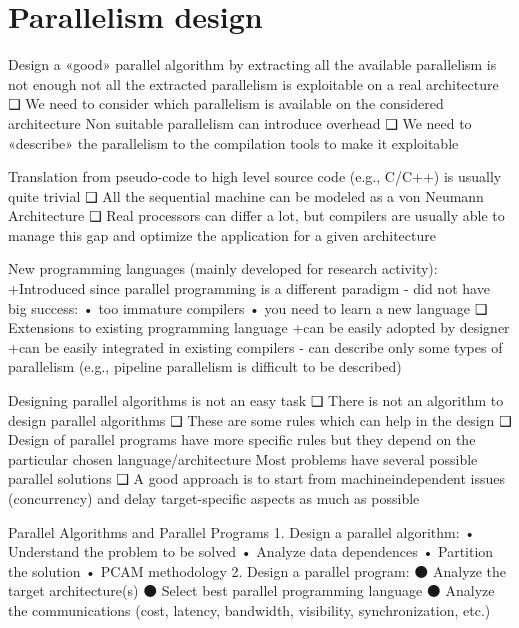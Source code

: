 \section{Parallelism design}




Design a «good» parallel algorithm by extracting
all the available parallelism is not enough
not all the extracted parallelism is exploitable
on a real architecture
❑ We need to consider which parallelism is available
on the considered architecture
Non suitable parallelism can introduce overhead
❑ We need to «describe» the parallelism to the
compilation tools to make it exploitable

Translation from pseudo-code to high level source
code (e.g., C/C++) is usually quite trivial
❑ All the sequential machine can be modeled as a
von Neumann Architecture
❑ Real processors can differ a lot, but compilers are
usually able to manage this gap and optimize the
application for a given architecture

New programming languages (mainly developed
for research activity):
+Introduced since parallel programming is a
different paradigm
- did not have big success:
• too immature compilers
• you need to learn a new language
❑ Extensions to existing programming language
+can be easily adopted by designer
+can be easily integrated in existing compilers
- can describe only some types of parallelism
(e.g., pipeline parallelism is difficult to be
described)

Designing parallel algorithms is not an easy task
❑ There is not an algorithm to design parallel
algorithms
❑ These are some rules which can help in the design
❑ Design of parallel programs have more specific
rules but they depend on the particular chosen
language/architecture
Most problems have several possible parallel
solutions
❑ A good approach is to start from machineindependent issues (concurrency) and delay
target-specific aspects as much as possible

Parallel Algorithms and Parallel
Programs
1. Design a parallel algorithm:
• Understand the problem to be solved
• Analyze data dependences
• Partition the solution
• PCAM methodology
2. Design a parallel program:
⚫ Analyze the target architecture(s)
⚫ Select best parallel programming language
⚫ Analyze the communications (cost, latency,
bandwidth, visibility, synchronization, etc.)

